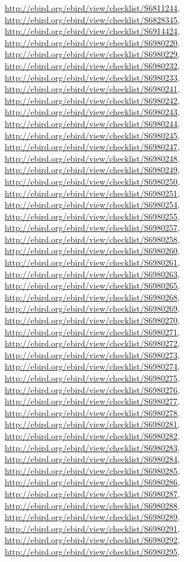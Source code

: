 \documentclass[9pt, article]{memoir}
\begin{document}
\begin{multicols}{2}
\url{http://ebird.org/ebird/view/checklist/S6811244}, 
\url{http://ebird.org/ebird/view/checklist/S6828345}, 
\url{http://ebird.org/ebird/view/checklist/S6914424}, 
\url{http://ebird.org/ebird/view/checklist/S6980220}, 
\url{http://ebird.org/ebird/view/checklist/S6980229}, 
\url{http://ebird.org/ebird/view/checklist/S6980232}, 
\url{http://ebird.org/ebird/view/checklist/S6980233}, 
\url{http://ebird.org/ebird/view/checklist/S6980241}, 
\url{http://ebird.org/ebird/view/checklist/S6980242}, 
\url{http://ebird.org/ebird/view/checklist/S6980243}, 
\url{http://ebird.org/ebird/view/checklist/S6980244}, 
\url{http://ebird.org/ebird/view/checklist/S6980245}, 
\url{http://ebird.org/ebird/view/checklist/S6980247}, 
\url{http://ebird.org/ebird/view/checklist/S6980248}, 
\url{http://ebird.org/ebird/view/checklist/S6980249}, 
\url{http://ebird.org/ebird/view/checklist/S6980250}, 
\url{http://ebird.org/ebird/view/checklist/S6980251}, 
\url{http://ebird.org/ebird/view/checklist/S6980254}, 
\url{http://ebird.org/ebird/view/checklist/S6980255}, 
\url{http://ebird.org/ebird/view/checklist/S6980257}, 
\url{http://ebird.org/ebird/view/checklist/S6980258}, 
\url{http://ebird.org/ebird/view/checklist/S6980260}, 
\url{http://ebird.org/ebird/view/checklist/S6980261}, 
\url{http://ebird.org/ebird/view/checklist/S6980263}, 
\url{http://ebird.org/ebird/view/checklist/S6980265}, 
\url{http://ebird.org/ebird/view/checklist/S6980268}, 
\url{http://ebird.org/ebird/view/checklist/S6980269}, 
\url{http://ebird.org/ebird/view/checklist/S6980270}, 
\url{http://ebird.org/ebird/view/checklist/S6980271}, 
\url{http://ebird.org/ebird/view/checklist/S6980272}, 
\url{http://ebird.org/ebird/view/checklist/S6980273}, 
\url{http://ebird.org/ebird/view/checklist/S6980274}, 
\url{http://ebird.org/ebird/view/checklist/S6980275}, 
\url{http://ebird.org/ebird/view/checklist/S6980276}, 
\url{http://ebird.org/ebird/view/checklist/S6980277}, 
\url{http://ebird.org/ebird/view/checklist/S6980278}, 
\url{http://ebird.org/ebird/view/checklist/S6980281}, 
\url{http://ebird.org/ebird/view/checklist/S6980282}, 
\url{http://ebird.org/ebird/view/checklist/S6980283}, 
\url{http://ebird.org/ebird/view/checklist/S6980284}, 
\url{http://ebird.org/ebird/view/checklist/S6980285}, 
\url{http://ebird.org/ebird/view/checklist/S6980286}, 
\url{http://ebird.org/ebird/view/checklist/S6980287}, 
\url{http://ebird.org/ebird/view/checklist/S6980288}, 
\url{http://ebird.org/ebird/view/checklist/S6980289}, 
\url{http://ebird.org/ebird/view/checklist/S6980291}, 
\url{http://ebird.org/ebird/view/checklist/S6980292}, 
\url{http://ebird.org/ebird/view/checklist/S6980295}, 

\end{multicols}
\end{document}

